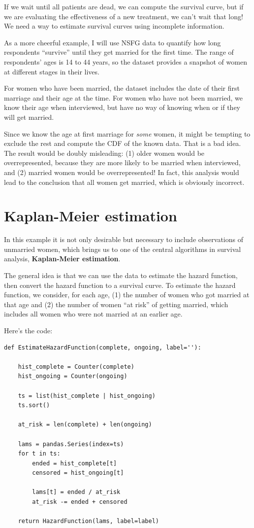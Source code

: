 \documentclass[12pt]{book}
\begin{document}
If we wait until all patients are dead, we can compute the survival
curve, but if we are evaluating the effectiveness of a new treatment,
we can't wait that long!  We need a way to estimate survival curves
using incomplete information.

As a more cheerful example, I will use NSFG data to quantify how
long respondents ``survive'' until they get married for the
first time.  The range of respondents' ages is 14 to 44 years, so
the dataset provides a snapshot of women at different stages in their
lives.

For women who have been married, the dataset includes the date
of their first marriage and their age at the time.
For women who have not been married, we know their age when interviewed,
but have no way of knowing when or if they will get married.

Since we know the age at first marriage for {\em some} women, it
might be tempting to exclude the rest and compute the CDF of
the known data.  That is a bad idea.  The result would
be doubly misleading: (1) older women would be overrepresented,
because they are more likely to be married when interviewed,
and (2) married women would be overrepresented!  In fact, this
analysis would lead to the conclusion that all women get married,
which is obviously incorrect.


\section{Kaplan-Meier estimation}

In this example it is not only desirable but necessary to include
observations of unmarried women, which brings us to one of the central
algorithms in survival analysis, {\bf Kaplan-Meier estimation}.

The general idea is that we can use the data to estimate the hazard
function, then convert the hazard function to a survival curve.
To estimate the hazard function, we consider, for each age,
(1) the number of women who got married at that age and (2) the number
of women ``at risk'' of getting married, which includes all women
who were not married at an earlier age.

Here's the code:

\begin{verbatim}
def EstimateHazardFunction(complete, ongoing, label=''):

    hist_complete = Counter(complete)
    hist_ongoing = Counter(ongoing)

    ts = list(hist_complete | hist_ongoing)
    ts.sort()

    at_risk = len(complete) + len(ongoing)

    lams = pandas.Series(index=ts)
    for t in ts:
        ended = hist_complete[t]
        censored = hist_ongoing[t]

        lams[t] = ended / at_risk
        at_risk -= ended + censored

    return HazardFunction(lams, label=label)
\end{verbatim}
\end{document}
